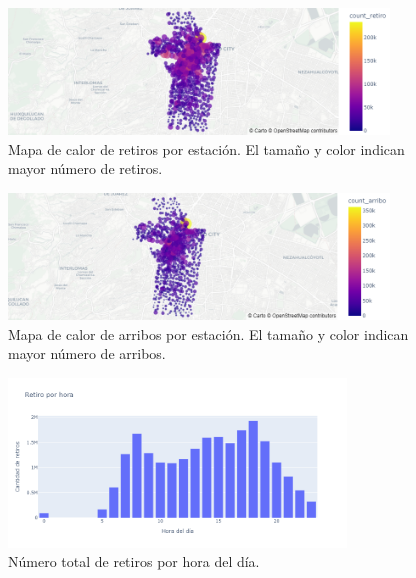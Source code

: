 \documentclass[12pt]{article}
\begin{document}
    \begin{figure}[htbp]
        \centering
        \includegraphics[width=0.9\textwidth]{Media/mapa_retiro.png} %
        \caption{Mapa de calor de retiros por estación. El tamaño y color indican mayor número de retiros.}
        \label{fig:mapa_retiros}
    \end{figure}

    \begin{figure}[htbp]
        \centering
        \includegraphics[width=0.9\textwidth]{Media/mapa_arribo.png} %
        \caption{Mapa de calor de arribos por estación. El tamaño y color indican mayor número de arribos.}
        \label{fig:mapa_arribos}
    \end{figure}

    \begin{figure}[htbp]
        \centering
        \includegraphics[width=0.8\textwidth]{Media/retiros_hora.png} %
        \caption{Número total de retiros por hora del día.}
        \label{fig:hora_retiros}
    \end{figure}
\end{document}
